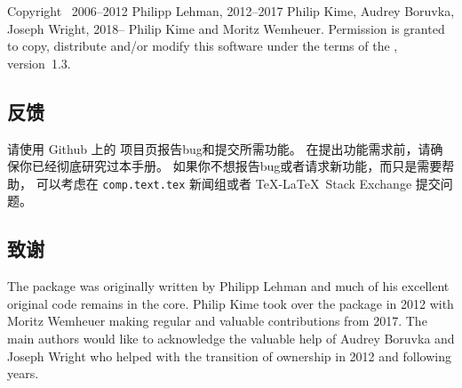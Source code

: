 Copyright \textcopyright\ 2006--2012 Philipp Lehman, 2012--2017 Philip Kime, Audrey Boruvka, Joseph Wright, 2018-- Philip Kime and Moritz Wemheuer. Permission is granted to copy, distribute and\slash or modify this software under  the terms of the \lppl, version~1.3.

\subsection{反馈}
\label{int:feb}


请使用 Github 上的 \biblatex 项目页报告bug和提交所需功能。
在提出功能需求前，请确保你已经彻底研究过本手册。
如果你不想报告bug或者请求新功能，而只是需要帮助，
可以考虑在 \texttt{comp.text.tex} 新闻组或者 \TeX-\LaTeX\ Stack Exchange 提交问题。

\subsection{致谢}

The package was originally written by Philipp Lehman and much of his excellent
original code remains in the core. Philip Kime took over the package in
2012 with Moritz Wemheuer making regular and valuable contributions from 2017.
The main authors would like to acknowledge the valuable help of Audrey
Boruvka and Joseph Wright who helped with the transition of ownership in
2012 and following years.

